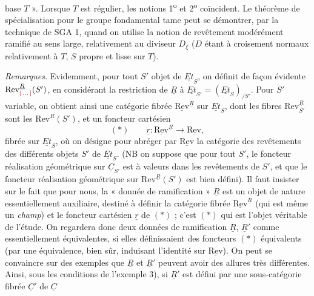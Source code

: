 \documentclass[11pt,a4paper]{article}
\begin{document}
base $T$ ». Lorsque $T$ est régulier, les notions 1\textsuperscript{o} et
2\textsuperscript{o} coïncident. Le théorème de spécialisation pour le groupe
fondamental tame peut se démontrer, par la technique de SGA 1, quand on utilise
la notion de revêtement modérément ramifié au sens large, relativement au
diviseur  $D_\xi$ ($D$ étant à croisement
normaux relativement à $T$, $S$ propre et lisse sur $T$).

\emph{Remarques.} Evidemment, pour tout $S'$ objet de $\underline{Et}_S$, on
définit de façon évidente $\mathrm{Rev}^{\underline{R}}_{\ill{}}(S')$, en
considérant la restriction de $\underline{R}$ à $\underline{Et}_{S'} =
(\underline{Et}_S)_{/S'}$. Pour $S'$ variable, on obtient ainsi une catégorie
fibrée $\underline{\mathrm{Rev}}^{\underline{R}}$ sur $\underline{Et}_S$, dont
les fibres $\mathrm{Rev}^{\underline{R}}_{S'}$ sont les
$\mathrm{Rev}^{\underline{R}}(S')$, et un foncteur cartésien
\[
  (*) \qquad \underline{r} : \underline{\mathrm{Rev}}^{\underline{R}}
  \longrightarrow \underline{\mathrm{Rev}} ,
\]
fibrée sur $\underline{Et}_S$, où on désigne pour abréger par
$\underline{\mathrm{Rev}}$ la catégorie des revêtements des différents objets
$S'$ de $\underline{Et}_S$. (NB on suppose que pour tout $S'$, le foncteur
réalisation géométrique sur $\underline{C}_{S'}$ est à valeurs dans les
revêtements de $S'$, et que le foncteur réalisation géométrique sur
$\mathrm{Rev}^{\underline{R}}(S')$ est bien défini). Il faut insister sur le
fait que pour nous, la « donnée de ramification » $\underline{R}$ est un objet
de nature essentiellement auxiliaire, destiné à définir la catégorie fibrée
$\underline{\mathrm{Rev}}^{\underline{R}}$ (qui est même un \emph{champ}) et le
foncteur cartésien $\underline{r}$ de $(*)$ ; c'est $(*)$ qui est l'objet
véritable de l'étude. On regardera donc deux données de ramification
$\underline{R}$, $\underline{R}'$ comme essentiellement équivalentes, si elles
définissaient des foncteurs $(*)$ équivalents (par une équivalence, bien sûr,
induisant l'identité sur $\underline{\mathrm{Rev}}$). On peut se convaincre sur
des exemples que $\underline{R}$ et $\underline{R}'$ peuvent avoir des allures
très différentes. Ainsi, sous les conditions de l'exemple 3), si
$\underline{R}'$ est défini par une sous-catégorie fibrée $\underline{C}'$ de
$\underline{C}$
\end{document}
